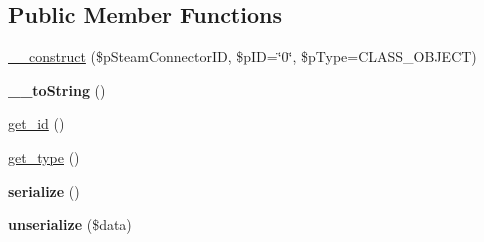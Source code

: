 \subsection*{Public Member Functions}
\begin{DoxyCompactItemize}
\item 
\hyperlink{classsteam__object_a6ea3696668baef2282d27f29eac8e51f}{\_\-\_\-construct} (\$pSteamConnectorID, \$pID=\char`\"{}0\char`\"{}, \$pType=CLASS\_\-OBJECT)
\item 
\hypertarget{classsteam__object_a63ade30c466c8333b203361c6df105cc}{
{\bfseries \_\-\_\-toString} ()}
\label{classsteam__object_a63ade30c466c8333b203361c6df105cc}

\item 
\hyperlink{classsteam__object_ac7a3134fd8d156a814c4350e77e3d3ae}{get\_\-id} ()
\item 
\hyperlink{classsteam__object_aad8cb8d4cad527360bde6b3b52c79de8}{get\_\-type} ()
\item 
\hypertarget{classsteam__object_a2c5726f43a7878b77a9d42bad89d2a42}{
{\bfseries serialize} ()}
\label{classsteam__object_a2c5726f43a7878b77a9d42bad89d2a42}

\item 
\hypertarget{classsteam__object_a104b1b1f193f74bf7823aa4bfc883abe}{
{\bfseries unserialize} (\$data)}
\label{classsteam__object_a104b1b1f193f74bf7823aa4bfc883abe}


\end{DoxyCompactItemize}

